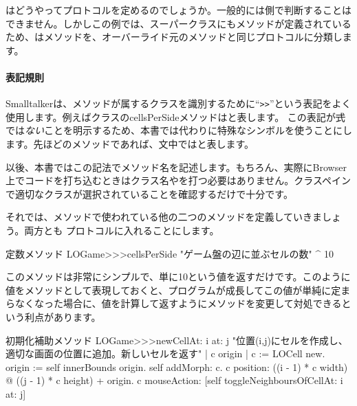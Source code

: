 \documentclass[a4paper,10pt,twoside]{book}
\begin{document}

\pharo はどうやってプロトコルを定めるのでしょうか。一般的には\pharo 側で判断することはできません。しかしこの例では、スーパークラスにもメソッドが定義されているため、\pharo はメソッドを、オーバーライド元のメソッドと同じプロトコルに分類します。



\paragraph{表記規則} Smalltalkerは、メソッドが属するクラスを識別するために``\verb|>>|''という表記をよく使用します。例えばクラスのcellsPerSideメソッドはと表します。
この表記が\st 式では\emph{ない}ことを明示するため、本書では代わりに特殊なシンボル\ct{>>>}を使うことにします。先ほどのメソッドであれば、文中ではと表します。


以後、本書ではこの記法でメソッド名を記述します。もちろん、実際にBrowser上でコードを打ち込むときはクラス名や\ct{>>>}を打つ必要はありません。クラスペインで適切なクラスが選択されていることを確認するだけで十分です。

それでは、メソッドで使われている他の二つのメソッドを定義していきましょう。両方とも プロトコルに入れることにします。

\begin{method}[sbegamecellsperside]{定数メソッド}
LOGame>>>cellsPerSide
   "ゲーム盤の辺に並ぶセルの数"
   ^ 10
\end{method}

このメソッドは非常にシンプルで、単に10という値を返すだけです。このように値をメソッドとして表現しておくと、プログラムが成長してこの値が単純に定まらなくなった場合に、値を計算して返すようにメソッドを変更して対処できるという利点があります。

\begin{method}[newCellAt:at:]{初期化補助メソッド}
LOGame>>>newCellAt: i at: j
   "位置(i,j)にセルを作成し、適切な画面の位置に追加。新しいセルを返す"
   | c origin |
   c := LOCell new.
   origin := self innerBounds origin.
   self addMorph: c.
   c position: ((i - 1) * c width) @ ((j - 1) * c height) + origin.
   c mouseAction: [self toggleNeighboursOfCellAt: i at: j]
\end{method}
\end{document}
